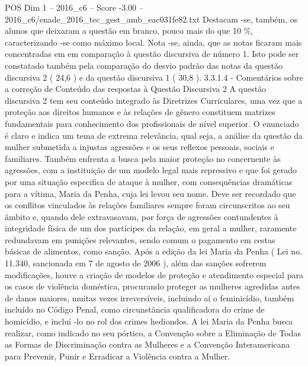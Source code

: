 \begin{textsample}{POS Dim 1 – 2016\_c6 – Score -3.00 – 2016\_c6/enade\_2016\_tec\_gest\_amb\_eac031fe82.txt}
Destacam -se, também, os alunos que deixaram a questão em branco, pouco mais do que 10 \%, caracterizando -se como máximo local.
Nota -se, ainda, que as notas ficaram mais concentradas em em comparação à questão discursiva de número 1.
Isto pode ser constatado também pela comparação do desvio padrão das notas da questão discursiva 2 ( 24,6 ) e da questão discursiva 1 ( 30,8 ). 3.3.1.4 - Comentários sobre a correção de Conteúdo das respostas à Questão Discursiva 2 A questão discursiva 2 tem seu conteúdo integrado às Diretrizes Curriculares, uma vez que a proteção aos direitos humanos e às relações de gênero constituem matrizes fundamentais para conhecimento dos profissionais de nível superior.
O enunciado é claro e indica um tema de extrema relevância, qual seja, a análise da questão da mulher submetida a injustas agressões e os seus reflexos pessoais, sociais e familiares.
Também enfrenta a busca pela maior proteção no concernente às agressões, com a instituição de um modelo legal mais repressivo e que foi gerado por uma situação especifica de ataque à mulher, com consequências dramáticas para a vítima, Maria da Penha, cuja lei levou seu nome.
Deve ser recordado que os conflitos vinculados às relações familiares sempre foram circunscritos ao seu âmbito e, quando dele extravasavam, por força de agressões contundentes à integridade física de um dos partícipes da relação, em geral a mulher, raramente redundavam em punições relevantes, sendo comum o pagamento em cestas básicas de alimentos, como sanção.
Após a edição da lei Maria da Penha ( Lei no. 11.340, sancionada em 7 de agosto de 2006 ), além das sanções sofrerem modificações, houve a criação de modelos de proteção e atendimento especial para os casos de violência doméstica, procurando proteger as mulheres agredidas antes de danos maiores, muitas vezes irreversíveis, incluindo aí o feminicídio, também incluído no Código Penal, como circunstância qualificadora do crime de homicídio, e incluí -lo no rol dos crimes hediondos.
A lei Maria da Penha busca realizar, como indicado no seu pórtico, a Convenção sobre a Eliminação de Todas as Formas de Discriminação contra as Mulheres e a Convenção Interamericana para Prevenir, Punir e Erradicar a Violência contra a Mulher.

\end{textsample}
